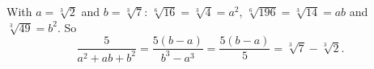 With $a=\sqrt[3]2$ and $b=\sqrt[3]7$: $\sqrt[6]{16}=\sqrt[3]4=a^2$, $\sqrt[6]{196}=\sqrt[3]{14}=ab$ and $\sqrt[3]{49}=b^2$. So
\[\dfrac{5}{a^2+ab+b^2}=\dfrac{5(b-a)}{b^3-a^3}=\dfrac{5(b-a)}{5}=\boxed{\sqrt[3]7-\sqrt[3]2}.\]
